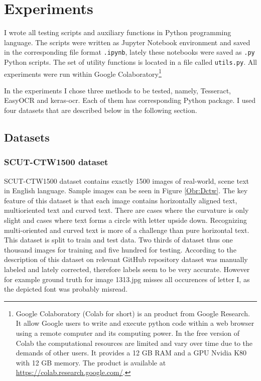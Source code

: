 \chapter{Experiments}
\label{ch:testing}
I wrote all testing scripts and auxiliary functions in Python programming language. The scripts were written as Jupyter Notebook environment and saved in the corresponding file format \texttt{.ipynb}, lately these notebooks were saved as \texttt{.py} Python scripts. The set of utility functions is located in a file called \texttt{utils.py}. All experiments were run within Google Colaboratory\footnote{Google Colaboratory (Colab for short) is an product from Google Research. It allow Google users to write and execute python code within a web browser using a remote computer and its computing power. In the free version of Colab the computational resources are limited and vary over time due to the demands of other users. It provides a 12 GB RAM and a GPU Nvidia K80 with 12 GB memory. The product is available at \url{https://colab.research.google.com/}.}

In the experiments I chose three methods to be tested, namely, Tesseract, EasyOCR and keras-ocr. Each of them has corresponding Python package. I used four datasets that are described below in the following section.

\section{Datasets}
\label{sec:expDatasets}

\subsection{SCUT-CTW1500 dataset}

SCUT-CTW1500 dataset contains exactly 1500 images of real-world, scene text in English language. Sample images can be seen in Figure \ref*{Obr:Dctw}. The key feature of this dataset is that each image contains horizontally aligned text, multioriented text and curved text. There are cases where the curvature is only slight and cases where text forms a circle with letter upside down. Recognizing multi-oriented and curved text is more of a challenge than pure horizontal text. This dataset is split to train and test data. Two thirds of dataset thus one thousand images for training and five hundred for testing. According to the description of this dataset on relevant GitHub repository dataset was manually labeled and lately corrected, therefore labels seem to be very accurate. However for example ground truth for image 1313.jpg misses all occurences of letter I, as the depicted font was probably misread.\cite{ctw,ctw2}


